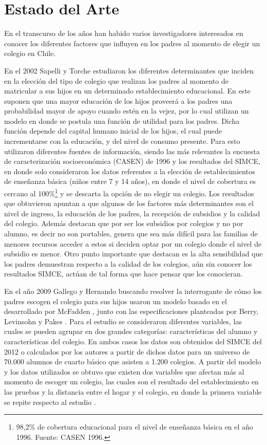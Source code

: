 \chapter{Estado del Arte}

En el transcurso de los años han habido varios investigadores interesados en conocer los diferentes factores que influyen en los padres al momento de elegir un colegio en Chile.

En el 2002 Sapelli y Torche \cite{SAPELLI2002} estudiaron los diferentes determinantes que inciden en la elección del tipo de colegio que realizan los padres al momento de matricular a sus hijos en un determinado establecimiento educacional. En este suponen que una mayor educación de los hijos proveerá a los padres  una probabilidad mayor de apoyo cuando estén en la vejez, por lo cual utilizan un modelo en donde se postula una función de utilidad para los padres. Dicha función depende del capital humano inicial de los hijos, el cual puede incrementarse con la educación, y del nivel de consumo presente. Para esto utilizaron diferentes fuentes de información, siendo las más relevantes la encuesta de caracterización socioeconómica (CASEN) de 1996 y los resultados del SIMCE, en donde solo consideraron los datos referentes a la elección de establecimientos de enseñanza básica (niños entre 7 y 14 años), en donde el nivel de cobertura es cercano al 100\%\footnote{98,2\% de cobertura educacional para el nivel de enseñanza básica en el año 1996. Fuente: CASEN 1996.} y se descarta la opción de no elegir un colegio. Los resultados que obtuvieron apuntan a que algunos de los factores más determinantes son el nivel de ingreso, la educación de los padres, la recepción de subsidios y la calidad del colegio. Además destacan que por ser los subsidios por colegios y no por alumno, es decir no son portables, genera que sea más difícil para las familias de menores recursos acceder a estos si deciden optar por un colegio donde el nivel de subsidio es menor. Otro punto importante que destacan es la alta sensibilidad que los padres demuestran respecto a la calidad de los colegios, aún sin conocer los resultados SIMCE, actúan de tal forma que hace pensar que los conocieran.

En el año 2009 Gallego y Hernando \cite{gallego2010school} buscando resolver la interrogante de cómo los padres escogen el colegio para sus hijos usaron un modelo basado en el desarrollado por McFadden \cite{McFadden74}, junto con las especificaciones planteadas por Berry, Levinsohn y Pakes \cite{berry1995automobile}. Para el estudio se consideraron diferentes variables, las cuales se pueden agrupar en dos grandes categorías: características del alumno y características del colegio. En ambos casos los datos son obtenidos del SIMCE del 2012 o calculados por los autores a partir de dichos datos para un universo de 70.000 alumnos de cuarto básico que asisten a 1.200 colegios. A partir del modelo y los datos utilizados se obtuvo que existen dos variables que afectan más al momento de escoger un colegio, las cuales son el resultado del establecimiento en las pruebas y la distancia entre el hogar y el colegio, en donde la primera variable se repite respecto al estudio \cite{SAPELLI2002}.

